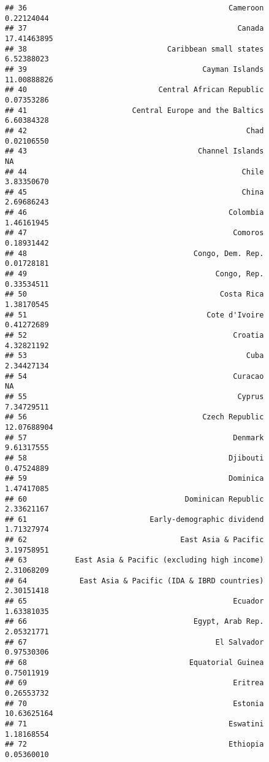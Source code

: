 \documentclass[]{article}
\begin{document}
\begin{verbatim}
## 36                                              Cameroon  0.22124044
## 37                                                Canada 17.41463895
## 38                                Caribbean small states  6.52388023
## 39                                        Cayman Islands 11.00888826
## 40                              Central African Republic  0.07353286
## 41                        Central Europe and the Baltics  6.60384328
## 42                                                  Chad  0.02106550
## 43                                       Channel Islands          NA
## 44                                                 Chile  3.83350670
## 45                                                 China  2.69686243
## 46                                              Colombia  1.46161945
## 47                                               Comoros  0.18931442
## 48                                      Congo, Dem. Rep.  0.01728181
## 49                                           Congo, Rep.  0.33534511
## 50                                            Costa Rica  1.38170545
## 51                                         Cote d'Ivoire  0.41272689
## 52                                               Croatia  4.32821192
## 53                                                  Cuba  2.34427134
## 54                                               Curacao          NA
## 55                                                Cyprus  7.34729511
## 56                                        Czech Republic 12.07688904
## 57                                               Denmark  9.61317555
## 58                                              Djibouti  0.47524889
## 59                                              Dominica  1.47417085
## 60                                    Dominican Republic  2.33621167
## 61                            Early-demographic dividend  1.71327974
## 62                                   East Asia & Pacific  3.19758951
## 63           East Asia & Pacific (excluding high income)  2.31068209
## 64            East Asia & Pacific (IDA & IBRD countries)  2.30151418
## 65                                               Ecuador  1.63381035
## 66                                      Egypt, Arab Rep.  2.05321771
## 67                                           El Salvador  0.97530306
## 68                                     Equatorial Guinea  0.75011919
## 69                                               Eritrea  0.26553732
## 70                                               Estonia 10.63625164
## 71                                              Eswatini  1.18168554
## 72                                              Ethiopia  0.05360010

\end{verbatim}
\end{document}
